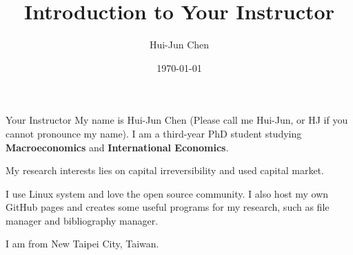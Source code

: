 \documentclass{beamer}
\title{Introduction to Your Instructor}
\author{Hui-Jun Chen}
\institute{The Ohio State University}
\date{\today}
\begin{document}
\maketitle

\begin{frame}{Your Instructor}
    My name is Hui-Jun Chen (Please call me Hui-Jun, or HJ if you cannot pronounce my name). I am a third-year PhD student studying  \textbf{Macroeconomics} and  \textbf{International Economics}.

    My research interests lies on capital irreversibility and used capital market.

    I use Linux system and love the open source community. I also host my own GitHub pages and creates some useful programs for my research, such as file manager and bibliography manager.

    I am from New Taipei City, Taiwan.
\end{frame}
\end{document}
